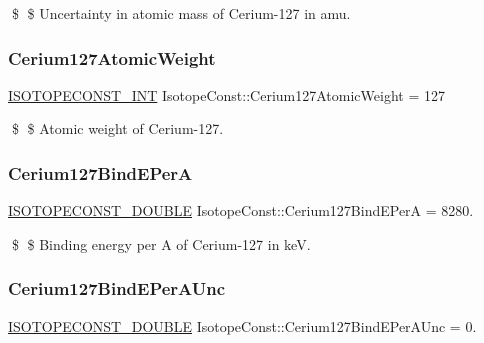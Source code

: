 \$ \$ Uncertainty in atomic mass of Cerium-\/127 in amu. \mbox{\label{group___isotope_const-_cerium-_ce127_ga4cdb3dfb6a12ae46719518a133f27d1e}} 
\subsubsection{\texorpdfstring{Cerium127\+Atomic\+Weight}{Cerium127AtomicWeight}}
{\footnotesize\ttfamily \mbox{\hyperlink{group___isotope_const-_macros_ga5f18360b3e99483a35c32d789e62621c}{I\+S\+O\+T\+O\+P\+E\+C\+O\+N\+S\+T\+\_\+\+I\+NT}} Isotope\+Const\+::\+Cerium127\+Atomic\+Weight = 127}

\$ \$ Atomic weight of Cerium-\/127. \mbox{\label{group___isotope_const-_cerium-_ce127_ga737f957bd7aef761c7e41172f3b8f291}} 
\subsubsection{\texorpdfstring{Cerium127\+Bind\+E\+PerA}{Cerium127BindEPerA}}
{\footnotesize\ttfamily \mbox{\hyperlink{group___isotope_const-_macros_ga8f45a7272ce02c0b4c65c44636ed719a}{I\+S\+O\+T\+O\+P\+E\+C\+O\+N\+S\+T\+\_\+\+D\+O\+U\+B\+LE}} Isotope\+Const\+::\+Cerium127\+Bind\+E\+PerA = 8280.}

\$ \$ Binding energy per A of Cerium-\/127 in keV. \mbox{\label{group___isotope_const-_cerium-_ce127_gad1d7f626e6c9284c13d46b4e64a6c3b3}} 
\subsubsection{\texorpdfstring{Cerium127\+Bind\+E\+Per\+A\+Unc}{Cerium127BindEPerAUnc}}
{\footnotesize\ttfamily \mbox{\hyperlink{group___isotope_const-_macros_ga8f45a7272ce02c0b4c65c44636ed719a}{I\+S\+O\+T\+O\+P\+E\+C\+O\+N\+S\+T\+\_\+\+D\+O\+U\+B\+LE}} Isotope\+Const\+::\+Cerium127\+Bind\+E\+Per\+A\+Unc = 0.}

